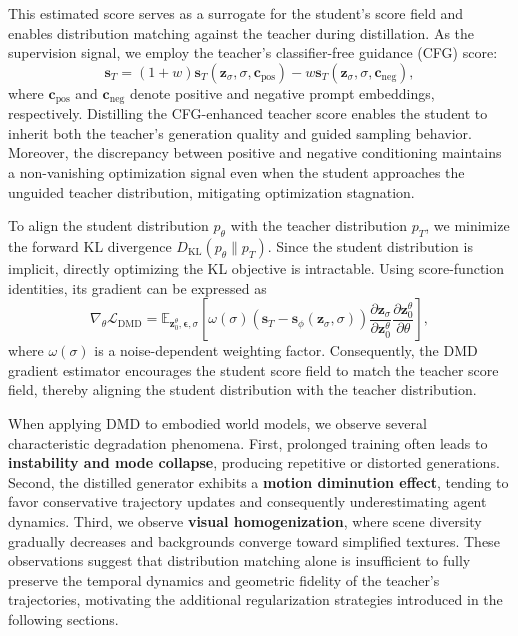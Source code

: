 This estimated score serves as a surrogate for the student's score field and enables distribution matching against the teacher during distillation. As the supervision signal, we employ the teacher's classifier-free guidance (CFG) score:
\begin{equation}
\mathbf{s}_T
=
(1+w)\mathbf{s}_T(\mathbf{z}_\sigma,\sigma,\mathbf{c}_{\mathrm{pos}})
-
w\mathbf{s}_T(\mathbf{z}_\sigma,\sigma,\mathbf{c}_{\mathrm{neg}}),
\end{equation}
where $\mathbf{c}_{\mathrm{pos}}$ and $\mathbf{c}_{\mathrm{neg}}$ denote positive and negative prompt embeddings, respectively. Distilling the CFG-enhanced teacher score enables the student to inherit both the teacher's generation quality and guided sampling behavior. Moreover, the discrepancy between positive and negative conditioning maintains a non-vanishing optimization signal even when the student approaches the unguided teacher distribution, mitigating optimization stagnation.

To align the student distribution $p_\theta$ with the teacher distribution $p_T$, we minimize the forward KL divergence $D_{\mathrm{KL}}(p_\theta \| p_T)$. Since the student distribution is implicit, directly optimizing the KL objective is intractable. Using score-function identities, its gradient can be expressed as
\begin{equation}
\nabla_\theta \mathcal{L}_{\mathrm{DMD}}
=
\mathbb{E}_{\mathbf{z}_0^\theta,\boldsymbol{\epsilon},\sigma}
\left[
\omega(\sigma)
\left(
\mathbf{s}_T
-
\mathbf{s}_\phi(\mathbf{z}_\sigma,\sigma)
\right)
\frac{\partial \mathbf{z}_\sigma}{\partial \mathbf{z}_0^\theta}
\frac{\partial \mathbf{z}_0^\theta}{\partial \theta}
\right],
\end{equation}
where $\omega(\sigma)$ is a noise-dependent weighting factor. Consequently, the DMD gradient estimator encourages the student score field to match the teacher score field, thereby aligning the student distribution with the teacher distribution.

When applying DMD to embodied world models, we observe several characteristic degradation phenomena. First, prolonged training often leads to \textbf{instability and mode collapse}, producing repetitive or distorted generations. Second, the distilled generator exhibits a \textbf{motion diminution effect}, tending to favor conservative trajectory updates and consequently underestimating agent dynamics. Third, we observe \textbf{visual homogenization}, where scene diversity gradually decreases and backgrounds converge toward simplified textures. These observations suggest that distribution matching alone is insufficient to fully preserve the temporal dynamics and geometric fidelity of the teacher's trajectories, motivating the additional regularization strategies introduced in the following sections.

